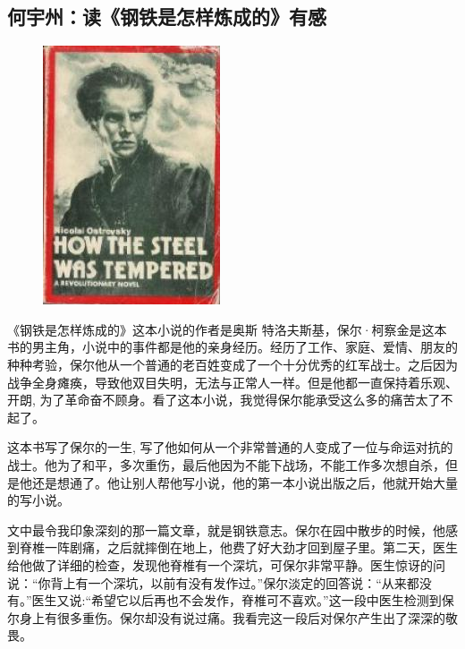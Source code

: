 \vspace{10pt}

{\centering\subsection*{何宇州：读《钢铁是怎样炼成的》有感}}


\renewcommand{\leftmark}{何宇州：读《钢铁是怎样炼成的》有感}

\begin{figure}[htbp]

\centering

\includegraphics[width = .5\textwidth]{./ch/42.jpg}

\end{figure}

《钢铁是怎样炼成的》这本小说的作者是奥斯 特洛夫斯基，保尔·柯察金是这本书的男主角，小说中的事件都是他的亲身经历。经历了工作、家庭、爱情、朋友的种种考验，保尔他从一个普通的老百姓变成了一个十分优秀的红军战士。之后因为战争全身瘫痪，导致他双目失明，无法与正常人一样。但是他都一直保持着乐观、开朗, 为了革命奋不顾身。看了这本小说，我觉得保尔能承受这么多的痛苦太了不起了。    

这本书写了保尔的一生, 写了他如何从一个非常普通的人变成了一位与命运对抗的战士。他为了和平，多次重伤，最后他因为不能下战场，不能工作多次想自杀，但是他还是想通了。他让别人帮他写小说，他的第一本小说出版之后，他就开始大量的写小说。 

文中最令我印象深刻的那一篇文章，就是钢铁意志。保尔在园中散步的时候，他感到脊椎一阵剧痛，之后就摔倒在地上，他费了好大劲才回到屋子里。第二天，医生给他做了详细的检查，发现他脊椎有一个深坑，可保尔非常平静。医生惊讶的问说：“你背上有一个深坑，以前有没有发作过。”保尔淡定的回答说：“从来都没有。”医生又说:“希望它以后再也不会发作，脊椎可不喜欢。”这一段中医生检测到保尔身上有很多重伤。保尔却没有说过痛。我看完这一段后对保尔产生出了深深的敬畏。

